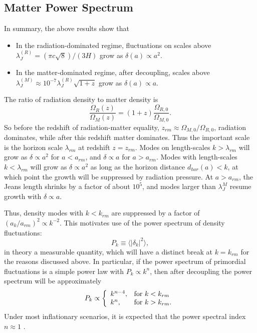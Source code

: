 \subsection{Matter Power Spectrum}
In summary, the above results show that
\begin{itemize}
  \item In the radiation-dominated regime, fluctuations on scales above
    $\lambda_J^{(R)} = (\pi c \sqrt{8})/(3 H)$ grow as
    $\delta(a) \propto a^2$.
  \item In the matter-dominated regime, after decoupling, scales above
    $\lambda_J^{(M)}\approx 10^{-7} \lambda_J^{(R)} \sqrt{1 + z}$
    grow as $\delta(a) \propto a$.
\end{itemize}
The ratio of radiation density to matter density is
\begin{equation}
  \frac{\Omega_R(z)}{\Omega_M(z)} = (1 + z)\frac{\Omega_{R,0}}{\Omega_{M,0}}.
\end{equation}
So before the redshift of radiation-matter equality,
$z_{rm} \approx \Omega_{M,0}/\Omega_{R,0}$, radiation
dominates, while after this redshift matter dominates.
Thus the important scale is the horizon scale $\lambda_{rm}$ at
redshift $z=z_{rm}$.
Modes on length-scales $k > \lambda_{rm}$ will grow as $\delta \propto a^2$
for $a < a_{rm}$, and $\delta \propto a$ for $a > a_{rm}$.  Modes with
length-scales $k < \lambda_{rm}$ will grow as $\delta \propto a^2$ as long
as the horizon distance $d_{hor}(a) < k$, at which point the growth will
be suppressed by radiation pressure.  At $a > a_{rm}$, the Jeans length
shrinks by a factor of about $10^5$, and modes larger than $\lambda_J^{M}$
resume growth with $\delta \propto a$.


Thus, density modes with $k < k_{rm}$ are suppressed by a factor of
$(a_k / a_{rm})^2 \propto k^{-2}$.  This motivates use of the power
spectrum of density fluctuations:
\begin{equation}
  \label{eq:power_spectrum}
  P_k \equiv \langle|\delta_k|^2\rangle,
\end{equation}
in theory a measurable quantity, which will have a distinct break at
$k = k_{rm}$ for the reasons discussed above.
In particular, if the power spectrum of primordial fluctuations
is a simple power law with $P_k \propto k^n$,
then after decoupling the power spectrum will be approximately
\begin{equation}
  P_k \propto \left\{
  \begin{array}{ll}
    k^{n-4}, & {\rm for\ } k < k_{rm} \\
    k^n, & {\rm for\ } k > k_{rm}.
  \end{array}
  \right.
\end{equation}
Under most inflationary scenarios, it is expected that the power spectral
index $n \approx 1$ \citep{peacock1999cosmological}.


